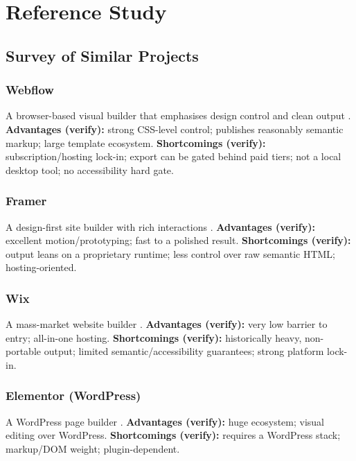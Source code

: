 
\chapter{Reference Study}
\label{ch:refstudy}

\section{Survey of Similar Projects}

\subsection{Webflow}
A browser-based visual builder that emphasises design control and clean output
\cite{webflow}.
\textbf{Advantages (verify):} strong CSS-level control; publishes reasonably
semantic markup; large template ecosystem.
\textbf{Shortcomings (verify):} subscription/hosting lock-in; export can be
gated behind paid tiers; not a local desktop tool; no accessibility hard gate.

\subsection{Framer}
A design-first site builder with rich interactions \cite{framer}.
\textbf{Advantages (verify):} excellent motion/prototyping; fast to a polished
result.
\textbf{Shortcomings (verify):} output leans on a proprietary runtime; less
control over raw semantic HTML; hosting-oriented.

\subsection{Wix}
A mass-market website builder \cite{wix}.
\textbf{Advantages (verify):} very low barrier to entry; all-in-one hosting.
\textbf{Shortcomings (verify):} historically heavy, non-portable output;
limited semantic/accessibility guarantees; strong platform lock-in.

\subsection{Elementor (WordPress)}
A WordPress page builder \cite{elementor}.
\textbf{Advantages (verify):} huge ecosystem; visual editing over WordPress.
\textbf{Shortcomings (verify):} requires a WordPress stack; markup/DOM weight;
plugin-dependent.


